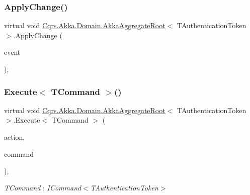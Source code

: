 \subsubsection{\texorpdfstring{Apply\+Change()}{ApplyChange()}}
{\footnotesize\ttfamily virtual void \hyperlink{classCqrs_1_1Akka_1_1Domain_1_1AkkaAggregateRoot}{Cqrs.\+Akka.\+Domain.\+Akka\+Aggregate\+Root}$<$ T\+Authentication\+Token $>$.Apply\+Change (\begin{DoxyParamCaption}\item[{\hyperlink{interfaceCqrs_1_1Events_1_1IEvent}{I\+Event}$<$ T\+Authentication\+Token $>$ @}]{event }\end{DoxyParamCaption})\hspace{0.3cm}{\ttfamily [protected]}, {\ttfamily [virtual]}}

\mbox{\label{classCqrs_1_1Akka_1_1Domain_1_1AkkaAggregateRoot_af8a9bd0e80498b3b54beb7cbec820533_af8a9bd0e80498b3b54beb7cbec820533}} 
\subsubsection{\texorpdfstring{Execute$<$ T\+Command $>$()}{Execute< TCommand >()}}
{\footnotesize\ttfamily virtual void \hyperlink{classCqrs_1_1Akka_1_1Domain_1_1AkkaAggregateRoot}{Cqrs.\+Akka.\+Domain.\+Akka\+Aggregate\+Root}$<$ T\+Authentication\+Token $>$.Execute$<$ T\+Command $>$ (\begin{DoxyParamCaption}\item[{Action$<$ T\+Command $>$}]{action,  }\item[{T\+Command}]{command }\end{DoxyParamCaption})\hspace{0.3cm}{\ttfamily [protected]}, {\ttfamily [virtual]}}

\begin{Desc}
\item[Type Constraints]\begin{description}
\item[{\em T\+Command} : {\em I\+Command$<$T\+Authentication\+Token$>$}]\end{description}
\end{Desc}
\mbox{\label{classCqrs_1_1Akka_1_1Domain_1_1AkkaAggregateRoot_a2d11510fec0129ba318f63f7103aeec0_a2d11510fec0129ba318f63f7103aeec0}} 
